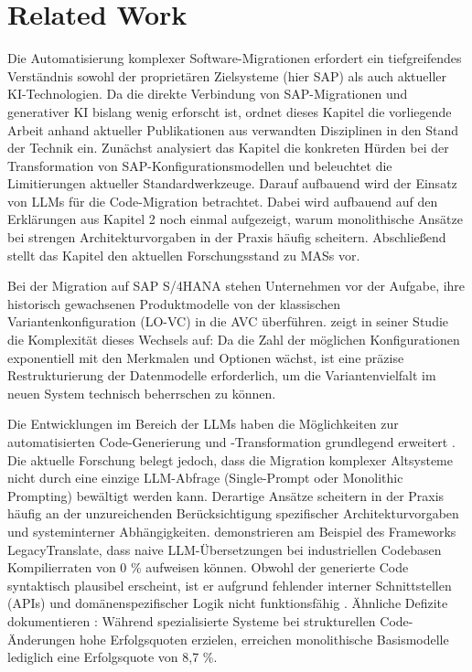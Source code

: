 \chapter{Related Work}
\label{ch:relatedwork}
Die Automatisierung komplexer Software-Migrationen erfordert ein tiefgreifendes Verständnis sowohl der proprietären Zielsysteme (hier SAP) als auch aktueller \ac{KI}-Technologien. Da die direkte Verbindung von SAP-Migrationen und generativer \ac{KI} bislang wenig erforscht ist, ordnet dieses Kapitel die vorliegende Arbeit anhand aktueller Publikationen aus verwandten Disziplinen in den Stand der Technik ein. Zunächst analysiert das Kapitel die konkreten Hürden bei der Transformation von SAP-Konfigurationsmodellen und beleuchtet die Limitierungen aktueller Standardwerkzeuge. Darauf aufbauend wird der Einsatz von \ac{LLMs} für die Code-Migration betrachtet. Dabei wird aufbauend auf den Erklärungen aus Kapitel 2 noch einmal aufgezeigt, warum monolithische Ansätze bei strengen Architekturvorgaben in der Praxis häufig scheitern. Abschließend stellt das Kapitel den aktuellen Forschungsstand zu \acp{MAS} vor.

Bei der Migration auf SAP S/4HANA stehen Unternehmen vor der Aufgabe, ihre historisch gewachsenen Produktmodelle von der klassischen Variantenkonfiguration (\ac{LO-VC}) in die \ac{AVC} überführen. \textcite[S. 31]{matilainenChangeRequirementsProduct2024} zeigt in seiner Studie die Komplexität dieses Wechsels auf: Da die Zahl der möglichen Konfigurationen exponentiell mit den Merkmalen und Optionen wächst, ist eine präzise Restrukturierung der Datenmodelle erforderlich, um die Variantenvielfalt im neuen System technisch beherrschen zu können.

Die Entwicklungen im Bereich der \ac{LLMs} haben die Möglichkeiten zur automatisierten Code-Generierung und -Transformation grundlegend erweitert \parencite{karabiyikRefactorGPTChatGPTbasedMultiagent2025}. Die aktuelle Forschung belegt jedoch, dass die Migration komplexer Altsysteme nicht durch eine einzige \ac{LLM}-Abfrage (Single-Prompt oder Monolithic Prompting) bewältigt werden kann. Derartige Ansätze scheitern in der Praxis häufig an der unzureichenden Berücksichtigung spezifischer Architekturvorgaben und systeminterner Abhängigkeiten. \textcite{motiLegacyTranslateLLMbasedMultiAgent2026} demonstrieren am Beispiel des Frameworks LegacyTranslate, dass naive \ac{LLM}-Übersetzungen bei industriellen Codebasen Kompilierraten von 0 \% aufweisen können. Obwohl der generierte Code syntaktisch plausibel erscheint, ist er aufgrund fehlender interner Schnittstellen (APIs) und domänenspezifischer Logik nicht funktionsfähig \parencite{motiLegacyTranslateLLMbasedMultiAgent2026}. Ähnliche Defizite dokumentieren \textcite{xuMANTRAEnhancingAutomated2025}: Während spezialisierte Systeme bei strukturellen Code-Änderungen hohe Erfolgsquoten erzielen, erreichen monolithische Basismodelle lediglich eine Erfolgsquote von 8,7 \%.

